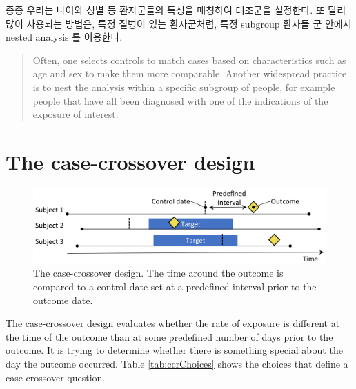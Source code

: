 \documentclass[]{book}
\begin{document}
종종 우리는 나이와 성별 등 환자군들의 특성을 매칭하여 대조군을 설정한다. 또 달리 많이 사용되는 방법은, 특정 질병이 있는 환자군처럼, 특정 subgroup 환자들 군 안에서 nested analysis 를 이용한다.

\begin{quote}
Often, one selects controls to match cases based on characteristics such as age and sex to make them more comparable. Another widespread practice is to nest the analysis within a specific subgroup of people, for example people that have all been diagnosed with one of the indications of the exposure of interest.
\end{quote}

\hypertarget{the-case-crossover-design}{%
\section{The case-crossover design}\label{the-case-crossover-design}}


\begin{figure}

{\centering \includegraphics[width=0.9\linewidth]{images/PopulationLevelEstimation/caseCrossover} 

}

\caption{The case-crossover design. The time around the outcome is compared to a control date set at a predefined interval prior to the outcome date.}\label{fig:caseCrossover}
\end{figure}

The case-crossover \citep{maclure_1991} design evaluates whether the rate of exposure is different at the time of the outcome than at some predefined number of days prior to the outcome. It is trying to determine whether there is something special about the day the outcome occurred. Table \ref{tab:ccrChoices} shows the choices that define a case-crossover question.  
\end{document}
